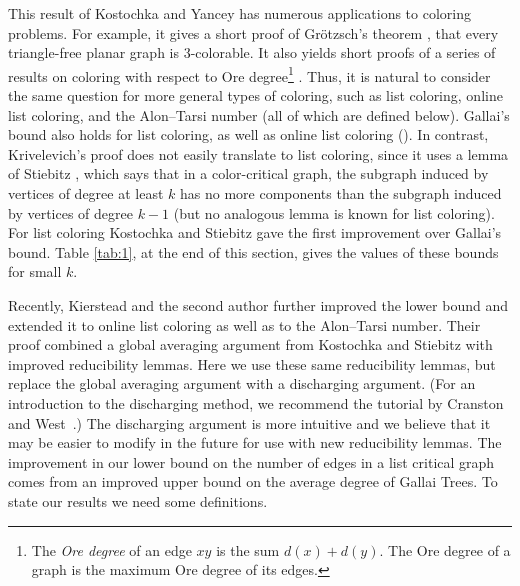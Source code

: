 \documentclass[12pt]{article}
\theoremstyle{plain}
\theoremstyle{definition}
\theoremstyle{remark}
\begin{document}
This result of Kostochka and Yancey has numerous applications to coloring problems.
For example, it gives a short proof of Gr\"otzsch's theorem
\cite{kostochka2012oregrotsch}, that every
triangle-free planar graph is 3-colorable.  It also 
 yields short proofs of a series of results on coloring with
respect to Ore degree\footnote{The \emph{Ore degree} of an edge $xy$ is the sum
$d(x)+d(y)$.  The Ore degree of a graph is the maximum Ore degree of its edges.} \cite{kierstead2009ore, rabern2010a, krs_one}. 
%
Thus,
it is natural to consider the same question for more general types of coloring,
such as list coloring, online list coloring, and the Alon--Tarsi number (all of
which are defined below).
Gallai's bound
\cite{gallai1963kritische} also holds for list coloring, as well as online list coloring
(\cite{kostochkastiebitzedgesincriticalgraph, riasat2012critically}). 
In contrast,
Krivelevich's proof \cite{krivelevich1997minimal} does not easily translate to list
coloring, since it uses a lemma of Stiebitz \cite{stiebitz1982proof}, which says that
in a color-critical graph, the subgraph induced by vertices of degree at least
$k$ has no more components than the subgraph induced by vertices of degree
$k-1$ (but no analogous lemma is known for list coloring). For list coloring
Kostochka and Stiebitz
\cite{kostochkastiebitzedgesincriticalgraph} gave the first improvement over
Gallai's bound. 
Table \ref{tab:1}, at the end of this section, gives the values of these bounds
for small $k$. 

Recently, Kierstead and the
second author \cite{OreVizing} further improved the lower bound and extended it
to online list coloring as well as to the Alon--Tarsi number.  Their proof combined
a global averaging argument from Kostochka and Stiebitz
\cite{kostochkastiebitzedgesincriticalgraph} with improved reducibility lemmas.
 Here we use these same reducibility lemmas, but replace the global averaging
argument with a discharging argument.  (For an introduction to the discharging
method, we recommend the tutorial by Cranston and West~\cite{CW-guide}.)
The discharging argument is more
intuitive and we believe that it may be easier to modify in the future for use
with new reducibility lemmas.  The improvement in our lower bound on the number
of edges in a list critical graph comes from an improved upper bound on the average
degree of Gallai Trees.  To state our results we need some definitions.
\end{document}
